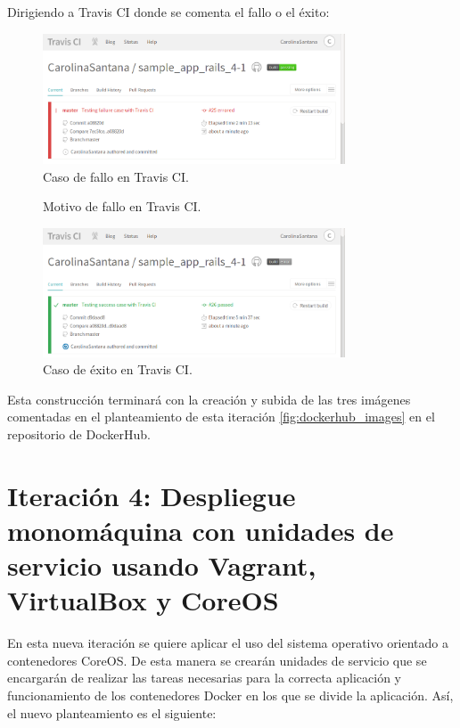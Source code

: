 Dirigiendo a Travis CI donde se comenta el fallo o el éxito:

\begin{figure}[H]
\centering
\includegraphics[width=0.8\textwidth]{images/figures/travisfailure2.png}
\caption{Caso de fallo en Travis CI.\label{fig:figure_placement_example}}
\end{figure}

\begin{figure}[H]
\centering
{}
\caption{Motivo de fallo en Travis CI.\label{fig:figure_placement_example}}
\end{figure}

\begin{figure}[H]
\centering
\includegraphics[width=0.8\textwidth]{images/figures/travissuccess2.png}
\caption{Caso de éxito en Travis CI.\label{fig:figure_placement_example}}
\end{figure}

Esta construcción terminará con la creación y subida de las tres imágenes comentadas en el planteamiento de esta iteración \ref{fig:dockerhub_images} en el repositorio de DockerHub.

\section{Iteración 4: Despliegue monomáquina con unidades de servicio usando Vagrant, VirtualBox y CoreOS}

En esta nueva iteración se quiere aplicar el uso del sistema operativo orientado a contenedores CoreOS. De esta manera se crearán unidades de servicio  que se encargarán de realizar las tareas necesarias para la correcta aplicación y funcionamiento de los contenedores Docker en los que se divide la aplicación. Así, el nuevo planteamiento es el siguiente:

